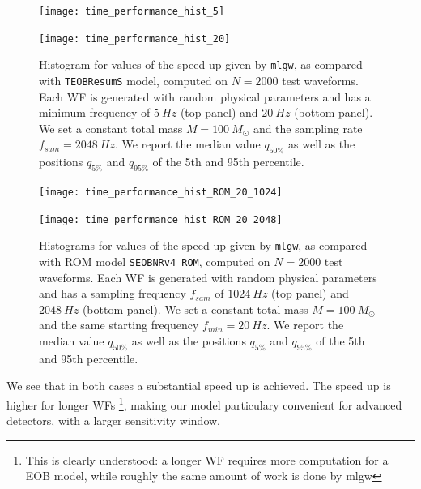 \newcommand{\factor}{.9}
\begin{figure}
	\centering
	\begin{minipage}{\factor\linewidth}
	    \texttt{[image: time\_performance\_hist\_5]}
	\end{minipage}\hfill
	\begin{minipage}{\factor\linewidth}
	    \texttt{[image: time\_performance\_hist\_20]}
	\end{minipage}

	\caption{
Histogram for values of the speed up given by \texttt{mlgw}, as compared with \texttt{TEOBResumS} model, computed on $N=2000$ test waveforms. Each WF is generated with random physical parameters and has a minimum frequency of $\SI{5}{Hz}$ (top panel) and $\SI{20}{Hz}$ (bottom panel).
We set a constant total mass $M=\SI{100}{M_\odot}$ and the sampling rate $f_{sam} = \SI{2048}{Hz}$.
We report the median value $q_{50\%}$ as well as the positions $q_{5\%}$ and $q_{95\%}$ of the 5th and 95th percentile.
}
	\label{fig:time_performance_hist}
\end{figure}
\begin{figure}
	\centering
	\begin{minipage}{\factor\linewidth}
	    \texttt{[image: time\_performance\_hist\_ROM\_20\_1024]}
	\end{minipage}\hfill
	\begin{minipage}{\factor\linewidth}
	    \texttt{[image: time\_performance\_hist\_ROM\_20\_2048]}
	\end{minipage}

	\caption{
Histograms for values of the speed up given by \texttt{mlgw}, as compared with ROM model \texttt{SEOBNRv4\_ROM}, computed on $N=2000$ test waveforms.
Each WF is generated with random physical parameters and has a sampling frequency $f_{sam}$ of $\SI{1024}{Hz}$ (top panel) and $\SI{2048}{Hz}$ (bottom panel).
We set a constant total mass $M=\SI{100}{M_\odot}$ and the same starting frequency $f_{min} = \SI{20}{Hz}$.
We report the median value $q_{50\%}$ as well as the positions $q_{5\%}$ and $q_{95\%}$ of the 5th and 95th percentile.
}
	\label{fig:time_performance_hist_ROM}
\end{figure}

We see that in both cases a substantial speed up is achieved. The speed up is higher for longer WFs
\footnote{This is clearly understood: a longer WF requires more computation for a EOB model, while roughly the same amount of work is done by mlgw}, 
making our model particulary convenient for advanced detectors, with a larger sensitivity window.
\par
